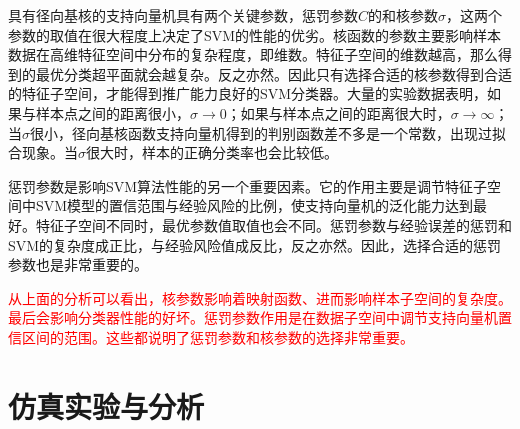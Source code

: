 具有径向基核的支持向量机具有两个关键参数，惩罚参数$C$的和核参数$\sigma$，这两个参数的取值在很大程度上决定了SVM的性能的优劣。核函数的参数主要影响样本数据在高维特征空间中分布的复杂程度，即维数。特征子空间的维数越高，那么得到的最优分类超平面就会越复杂。反之亦然。因此只有选择合适的核参数得到合适的特征子空间，才能得到推广能力良好的SVM分类器。大量的实验数据表明，如果与样本点之间的距离很小，$\sigma \rightarrow 0$；如果与样本点之间的距离很大时，$\sigma \rightarrow \infty$；当$\sigma$很小，径向基核函数支持向量机得到的判别函数差不多是一个常数，出现过拟合现象。当$\sigma$很大时，样本的正确分类率也会比较低。

惩罚参数是影响SVM算法性能的另一个重要因素。它的作用主要是调节特征子空间中SVM模型的置信范围与经验风险的比例，使支持向量机的泛化能力达到最好。特征子空间不同时，最优参数值取值也会不同。惩罚参数与经验误差的惩罚和SVM的复杂度成正比，与经验风险值成反比，反之亦然。因此，选择合适的惩罚参数也是非常重要的。

\textcolor{red}{
从上面的分析可以看出，核参数影响着映射函数、进而影响样本子空间的复杂度。最后会影响分类器性能的好坏。惩罚参数作用是在数据子空间中调节支持向量机置信区间的范围。这些都说明了惩罚参数和核参数的选择非常重要。
}
\section{仿真实验与分析}
